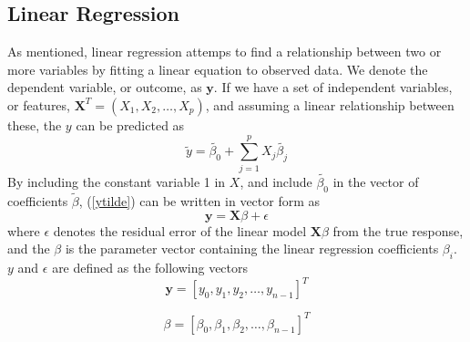 \documentclass{article}
\begin{document}
\subsection{Linear Regression}
As mentioned, linear regression attemps to find a relationship between two or more variables by fitting a linear equation to observed data. We denote the dependent variable, or outcome, as $\textbf{y}$. If we have a set of independent variables, or features, $\textbf{X}^{T} = (X_{1}, X_{2}, \dots, X_{p})$, and assuming a linear relationship between these, the $y$ can be predicted as
\begin{equation} \label{ytilde}
\tilde{y} = \tilde{\beta_{0}} + \sum_{j=1}^{p} X_{j} \tilde{\beta_{j}}
\end{equation}
By including the constant variable 1 in $X$, and include $\tilde{\beta_{0}}$ in the vector of coefficients $\tilde{\beta}$,  (\ref{ytilde}) can be written in vector form as
\begin{equation}\label{matrixform}
\textbf{y} = \textbf{X} \beta + \epsilon
\end{equation}
where $\epsilon$ denotes the residual error of the linear model $\textbf{X}\beta$ from the true response, and the $\beta$ is the parameter vector containing the linear regression coefficients $\beta_{i}$. $y$ and $\epsilon$ are defined as the following vectors
\begin{equation}
\textbf{y} = [y_{0}, y_{1}, y_{2}, \dots, y_{n-1}]^{T}
\end{equation}

\begin{equation}
\beta = [\beta_{0}, \beta_{1}, \beta_{2}, \dots, \beta_{n-1}]^{T}
\end{equation}
\end{document}
